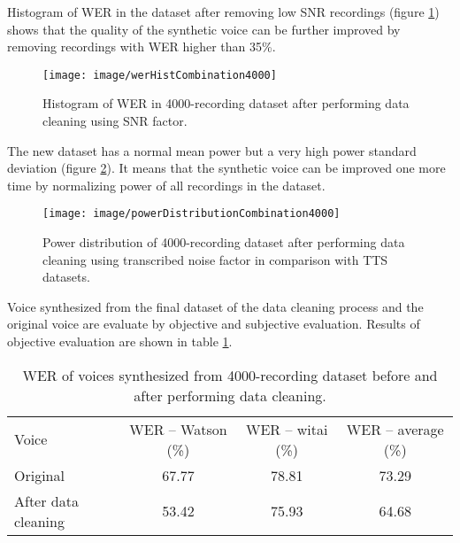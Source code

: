 \documentclass[12pt]{article}
\begin{document}
Histogram of WER in the dataset after removing low SNR recordings (figure \ref{fig_werHistCombination4000}) shows that the quality of the synthetic voice can be further improved by removing recordings with WER higher than 35\%.

\begin{figure}[t]
\begin{center}
\texttt{[image: image/werHistCombination4000]}
\end{center}
\vspace{-0.3cm}
\caption[WER hist combination 4000.]{Histogram of WER in 4000-recording dataset after performing data cleaning using SNR factor.}
\label{fig_werHistCombination4000}
\end{figure}

The new dataset has a normal mean power but a very high power standard deviation (figure \ref{fig_powerDistributionCombination4000}). It means that the synthetic voice can be improved one more time by normalizing power of all recordings in the dataset.

\begin{figure}[t]
\begin{center}
\texttt{[image: image/powerDistributionCombination4000]}
\end{center}
\vspace{-0.3cm}
\caption[power distribution combination 4000.]{Power distribution of 4000-recording dataset after performing data cleaning using transcribed noise factor in comparison with TTS datasets.}
\label{fig_powerDistributionCombination4000}
\end{figure}

Voice synthesized from the final dataset of the data cleaning process and the original voice are evaluate by objective and subjective evaluation. Results of objective evaluation are shown in table \ref{tab_werCombination4000}.

\begin{table}[]
\begin{center}
\caption{WER of voices synthesized from 4000-recording dataset before and after performing data cleaning.}
\label{tab_werCombination4000}
\vspace{3mm}
\begin{tabular}{lccc}
\hline
Voice & WER – Watson (\%) & WER – witai (\%) & WER – average (\%)\\
\cmidrule(l{0pt}r{2pt}){1-1}\cmidrule(l{0pt}r{2pt}){2-2}\cmidrule(l{0pt}r{2pt}){3-3}\cmidrule(l{0pt}r{2pt}){4-4}
Original            & 67.77 & 78.81 & 73.29 \\
After data cleaning & 53.42 & 75.93 & 64.68 \\
\hline
\end{tabular}
\end{center}
\end{table}
\end{document}
